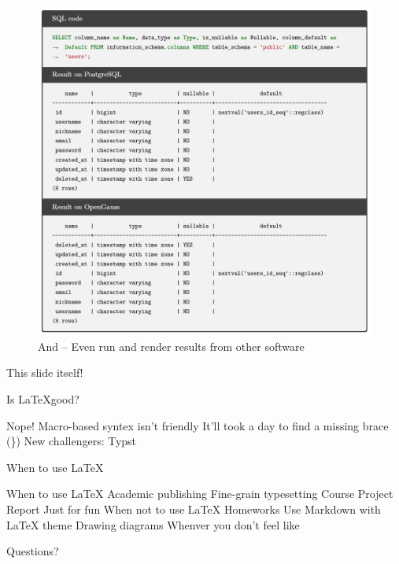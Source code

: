 \documentclass[scheme=plain,aspectratio=169]{ctexbeamer}
\let\OriginLaTeX\LaTeX
\renewcommand\LaTeX{\textrm{\OriginLaTeX\xspace}}
\begin{document}
\begin{frame}
    \begin{figure}[htp]
      \centering
      \includegraphics[width=.5\linewidth]{image1.png}
      \caption{And -- Even run and render results from other software}
    \end{figure}
\end{frame}

\begin{frame}[standout]
    This slide itself!
\end{frame}

\begin{frame}{Is \LaTeX good?}
    \begin{outline}
        \1 Nope!
            \2 Macro-based syntex isn't friendly
            \2 It'll took a day to find a missing brace (\})
        \1 New challengers:
            \2 Typst
    \end{outline}
\end{frame}

\begin{frame}{When to use \LaTeX}
    \begin{outline}
        \1 When to use \LaTeX
            \2 Academic publishing
            \2 Fine-grain typesetting
                \3 Course Project Report
            \2 Just for fun
        \1 When not to use \LaTeX
            \2 Homeworks
                \3 Use Markdown with LaTeX theme
            \2 Drawing diagrams
            \2 Whenver you don't feel like
    \end{outline}
\end{frame}

\begin{frame}[standout]
    Questions?
\end{frame}
\end{document}
